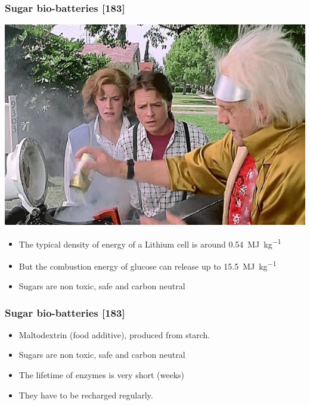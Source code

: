 \documentclass[a4paper,11pt,handout]{beamer}
\begin{document}
\begin{frame}
\frametitle{Sugar bio-batteries [183]}

	\begin{center}
	\includegraphics[scale=0.3]{trash.jpg}
	\end{center}

\begin{itemize}

	\item The typical density of energy of a Lithium cell is around 
	\SI{0.54}{\mega\joule\per\kilogram}

	\item But the combustion energy of glucose can release up to 
	\SI{15.5}{\mega\joule\per\kilogram}

	\item Sugars are non toxic, safe and carbon neutral

\end{itemize}
\end{frame}
\begin{frame}
\frametitle{Sugar bio-batteries [183]}

\begin{itemize}

	\item Maltodextrin (food additive), produced from starch.
	\item Sugars are non toxic, safe and carbon neutral
	\item The lifetime of enzymes is very short (weeks)
	\item They have to be recharged regularly.

\end{itemize}
\end{frame}
\note{}
\end{document}
